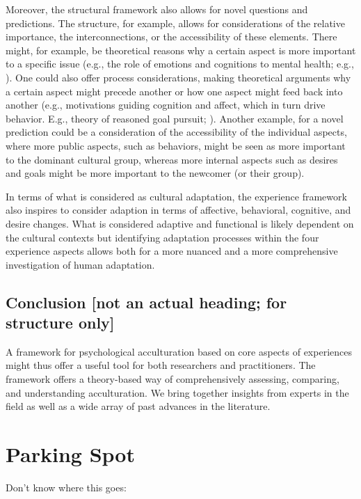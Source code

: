 \documentclass[man, 12pt, a4paper]{apa7}
\begin{document}
Moreover, the structural framework also allows for novel questions and predictions. The structure, for example, allows for considerations of the relative importance, the interconnections, or the accessibility of these elements. There might, for example, be theoretical reasons why a certain aspect is more important to a specific issue (e.g., the role of emotions and cognitions to mental health; e.g., \citealp{Crocker2013}). One could also offer process considerations, making theoretical arguments why a certain aspect might precede another or how one aspect might feed back into another (e.g., motivations guiding cognition and affect, which in turn drive behavior. E.g., theory of reasoned goal pursuit; \citealp{Ajzen2019}). Another example, for a novel prediction could be a consideration of the accessibility of the individual aspects, where more public aspects, such as behaviors, might be seen as more important to the dominant cultural group, whereas more internal aspects such as desires and goals might be more important to the newcomer (or their group).

In terms of what is considered as cultural adaptation, the experience framework also inspires to consider adaption in terms of affective, behavioral, cognitive, and desire changes. What is considered adaptive and functional is likely dependent on the cultural contexts but identifying adaptation processes within the four experience aspects allows both for a more nuanced and a more comprehensive investigation of human adaptation.

\subsection{Conclusion [not an actual heading; for structure only]}
A framework for psychological acculturation based on core aspects of experiences might thus offer a useful tool for both researchers and practitioners. The framework offers a theory-based way of comprehensively assessing, comparing, and understanding acculturation. We bring together insights from experts in the field as well as a wide array of past advances in the literature.

\newpage
\section{Parking Spot}
Don't know where this goes:
\end{document}
